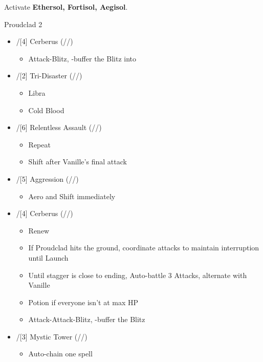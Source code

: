 \newpage
Activate \textbf{Ethersol, Fortisol, Aegisol}.
\renewcommand{\first}{[1]/[5] Aggression (\rav/\com/\com)}
\renewcommand{\second}{[2]/[4] Cerberus (\com/\com/\com)}
\renewcommand{\third}{[3]/[3] Mystic Tower (\rav/\sen/\rav)}
\renewcommand{\fourth}{[4]/[1] Solidarity (\com/\sen/\med)}
\renewcommand{\fifth}{[5]/[6] Relentless Assault (\rav/\com/\rav)}
\renewcommand{\sixth}{[6]/[2] Tri-Disaster (\rav/\rav/\rav)}
\begin{battle}{Proudclad 2}
\begin{multicols}{2}
\begin{itemize}
    \item \second
    \begin{itemize}
        \item Attack-Blitz, \rav-buffer the Blitz into
    \end{itemize}
    \item \sixth
    \begin{itemize}
        \item Libra
        \item Cold Blood
    \end{itemize}
    \item \fifth
    \begin{itemize}
        \item Repeat
        \item Shift after Vanille's final attack
    \end{itemize}
    \item \first
    \begin{itemize}
        \item Aero and Shift immediately
    \end{itemize}
    \item \second
    \begin{itemize}
        \item Renew
        \item If Proudclad hits the ground, coordinate attacks to maintain interruption until Launch
        \item Until stagger is close to ending, Auto-battle 3 Attacks, alternate with Vanille
        \item Potion if everyone isn't at max HP
        \item Attack-Attack-Blitz, \rav-buffer the Blitz
    \end{itemize}
    \item \third
    \begin{itemize}
        \item Auto-chain one spell

\end{itemize}
\end{itemize}
\end{multicols}
\end{battle}
